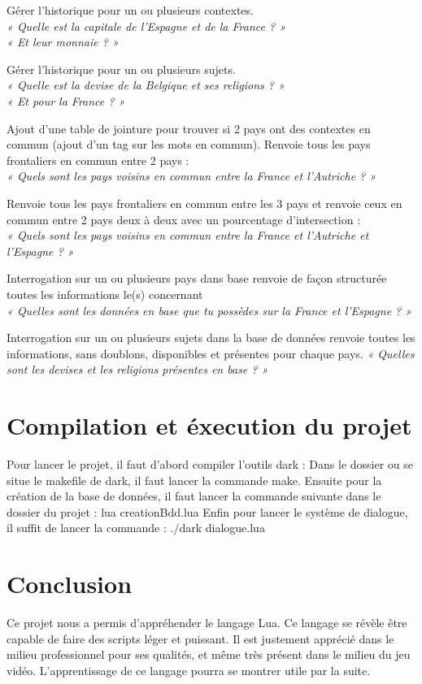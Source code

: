 \documentclass[11pt,a4paper]{article}
\begin{document}
Gérer l’historique pour un ou plusieurs contextes. \\
\textit{« Quelle est la capitale de l’Espagne et de la France ? »\\
	« Et leur monnaie ? »}

Gérer l’historique pour un ou plusieurs sujets. \\
\textit{« Quelle est la devise de la Belgique et ses religions ? » \\
	« Et pour la France ? »}

Ajout d’une table de jointure pour trouver si 2 pays ont des contextes en commun (ajout d’un tag sur les mots en commun). Renvoie tous les pays frontaliers en commun entre 2 pays : \\
\textit{« Quels sont les pays voisins en commun entre la France et l’Autriche ? »}

Renvoie tous les pays frontaliers en commun entre les 3 pays et renvoie ceux en commun entre 2 pays deux à deux avec un pourcentage d’intersection : \\
\textit{« Quels sont les pays voisins en commun entre la France et l’Autriche et l’Espagne ? »}

Interrogation sur un ou plusieurs pays dans base renvoie de façon structurée toutes les informations le(s) concernant \\
\textit{« Quelles sont les données en base que tu possèdes sur la France et l’Espagne ? »}

Interrogation sur un ou plusieurs sujets dans la base de données renvoie toutes les informations, sans doublons, disponibles et présentes pour chaque pays.
\textit{« Quelles sont les devises et les religions présentes en base ? »}


\section{Compilation et éxecution du projet}
Pour lancer le projet, il faut d'abord compiler l'outils dark :
Dans le dossier ou se situe le makefile de dark, il faut lancer la commande make.
Ensuite pour la création de la base de données, il faut lancer la commande suivante dans le dossier du projet :
lua creationBdd.lua
Enfin pour lancer le système de dialogue, il suffit de lancer la commande :
./dark dialogue.lua

\section{Conclusion}

Ce projet nous a permis d'appréhender le langage Lua. Ce langage se révèle être capable de faire des scripts léger et puissant. Il est justement apprécié dans le milieu professionnel pour ses qualités, et même très présent dans le milieu du jeu vidéo. L'apprentissage de ce langage pourra se montrer utile par la suite.
\end{document}

